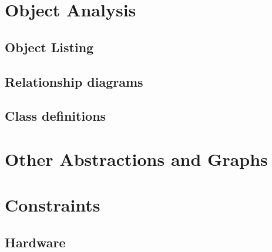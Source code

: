 \section{Object Analysis}

\subsection{Object Listing}

\subsection{Relationship diagrams}

\subsection{Class definitions}

\section{Other Abstractions and Graphs}

\section{Constraints}

\subsection{Hardware}


